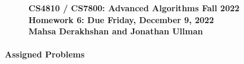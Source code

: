 \documentclass[11pt]{article}
\theoremstyle{definition}
\newcommand{\HWtitle}[2]{\begin{figure}[t!]{\bfseries \Large \color{DarkBlue}  \noindent CS4810 / CS7800: Advanced Algorithms \hfill Fall 2022} \\[0.2em] {\bfseries \Large \color{DarkBlue} Homework #1: Due {#2}} \\[1em] {\bfseries \large Mahsa Derakhshan and Jonathan Ullman}\\[1ex] \end{figure}}
\begin{document}

\HWtitle{6}{Friday, December 9, 2022}


%
\medskip

\renewcommand{\labelenumii}{{\bfseries \em \arabic{enumi}.\arabic{enumii}}}
\newcommand{\problemitem}{\renewcommand{\labelenumi}{{\bfseries \em Problem \arabic{enumi}}}\item}
\newcommand{\solutionitem}{\renewcommand{\labelenumi}{{\bfseries \em Solution \arabic{enumi}}}\addtocounter{enumi}{-1}\item}

\paragraph{Assigned Problems} \phantom{.}
\end{document}
